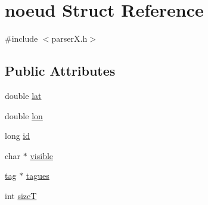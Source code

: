 \hypertarget{structnoeud}{\section{noeud Struct Reference}
\label{structnoeud}
}


{\ttfamily \#include $<$parser\-X.\-h$>$}

\subsection*{Public Attributes}
\begin{DoxyCompactItemize}
\item 
double \hyperlink{structnoeud_a3ae810fe8716673860124a82ed3095d3}{lat}
\item 
double \hyperlink{structnoeud_a6815797ced511a355ce268e226d1f1f4}{lon}
\item 
long \hyperlink{structnoeud_a222a85d52e80824f5f75e54ca0f65ce8}{id}
\item 
char $\ast$ \hyperlink{structnoeud_aed8c867c16325b8f8f48e13ab2668ddd}{visible}
\item 
\hyperlink{structtag}{tag} $\ast$ \hyperlink{structnoeud_af58bb6ad2885cb12e17cdc8cc0543358}{tagues}
\item 
int \hyperlink{structnoeud_acd28afd8fa9ed63b4dd844268dd25817}{size\-T}
\end{DoxyCompactItemize}


